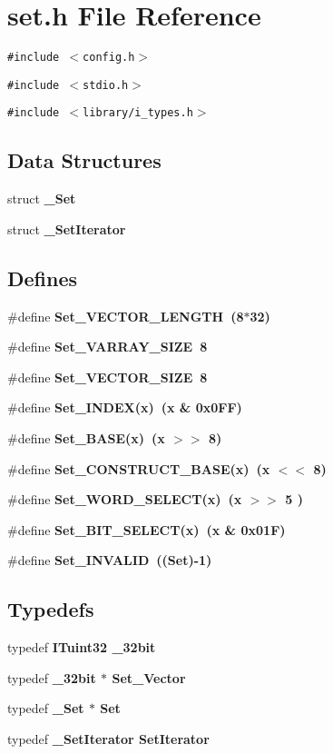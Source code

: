 \section{set.h File Reference}
\label{set_8h}
{\tt \#include $<$config.h$>$}\par
{\tt \#include $<$stdio.h$>$}\par
{\tt \#include $<$library/i\_\-types.h$>$}\par
\subsection*{Data Structures}
\begin{CompactItemize}
\item 
struct \bf{\_\-Set}
\item 
struct \bf{\_\-Set\-Iterator}
\end{CompactItemize}
\subsection*{Defines}
\begin{CompactItemize}
\item 
\#define \bf{Set\_\-VECTOR\_\-LENGTH}~(8$\ast$32)
\item 
\#define \bf{Set\_\-VARRAY\_\-SIZE}~8
\item 
\#define \bf{Set\_\-VECTOR\_\-SIZE}~8
\item 
\#define \bf{Set\_\-INDEX}(x)~(x \& 0x0FF)
\item 
\#define \bf{Set\_\-BASE}(x)~(x $>$$>$ 8)
\item 
\#define \bf{Set\_\-CONSTRUCT\_\-BASE}(x)~(x $<$$<$ 8)
\item 
\#define \bf{Set\_\-WORD\_\-SELECT}(x)~(x $>$$>$ 5 )
\item 
\#define \bf{Set\_\-BIT\_\-SELECT}(x)~(x \& 0x01F)
\item 
\#define \bf{Set\_\-INVALID}~((\bf{Set})-1)
\end{CompactItemize}
\subsection*{Typedefs}
\begin{CompactItemize}
\item 
typedef \bf{ITuint32} \bf{\_\-32bit}
\item 
typedef \bf{\_\-32bit} $\ast$ \bf{Set\_\-Vector}
\item 
typedef \bf{\_\-Set} $\ast$ \bf{Set}
\item 
typedef \bf{\_\-Set\-Iterator} \bf{Set\-Iterator}
\end{CompactItemize}
